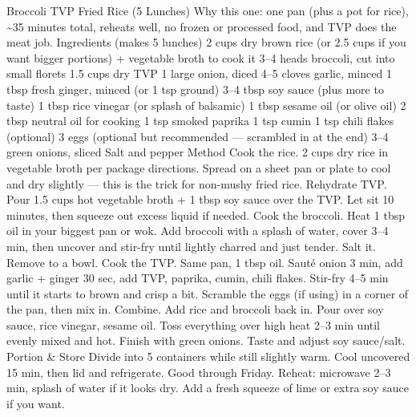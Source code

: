 Broccoli TVP Fried Rice (5 Lunches) Why this one: one pan (plus a pot for rice), \~{}35 minutes total, reheats well, no frozen or processed food, and TVP does the meat job. Ingredients (makes 5 lunches) 2 cups dry brown rice (or 2.5 cups if you want bigger portions) + vegetable broth to cook it 3–4 heads broccoli, cut into small florets 1.5 cups dry TVP 1 large onion, diced 4–5 cloves garlic, minced 1 tbsp fresh ginger, minced (or 1 tsp ground) 3–4 tbsp soy sauce (plus more to taste) 1 tbsp rice vinegar (or splash of balsamic) 1 tbsp sesame oil (or olive oil) 2 tbsp neutral oil for cooking 1 tsp smoked paprika 1 tsp cumin 1 tsp chili flakes (optional) 3 eggs (optional but recommended — scrambled in at the end) 3–4 green onions, sliced Salt and pepper Method Cook the rice. 2 cups dry rice in vegetable broth per package directions. Spread on a sheet pan or plate to cool and dry slightly — this is the trick for non-mushy fried rice. Rehydrate TVP. Pour 1.5 cups hot vegetable broth + 1 tbsp soy sauce over the TVP. Let sit 10 minutes, then squeeze out excess liquid if needed. Cook the broccoli. Heat 1 tbsp oil in your biggest pan or wok. Add broccoli with a splash of water, cover 3–4 min, then uncover and stir-fry until lightly charred and just tender. Salt it. Remove to a bowl. Cook the TVP. Same pan, 1 tbsp oil. Sauté onion 3 min, add garlic + ginger 30 sec, add TVP, paprika, cumin, chili flakes. Stir-fry 4–5 min until it starts to brown and crisp a bit. Scramble the eggs (if using) in a corner of the pan, then mix in. Combine. Add rice and broccoli back in. Pour over soy sauce, rice vinegar, sesame oil. Toss everything over high heat 2–3 min until evenly mixed and hot. Finish with green onions. Taste and adjust soy sauce/salt. Portion \& Store Divide into 5 containers while still slightly warm. Cool uncovered 15 min, then lid and refrigerate. Good through Friday. Reheat: microwave 2–3 min, splash of water if it looks dry. Add a fresh squeeze of lime or extra soy sauce if you want.
\par

